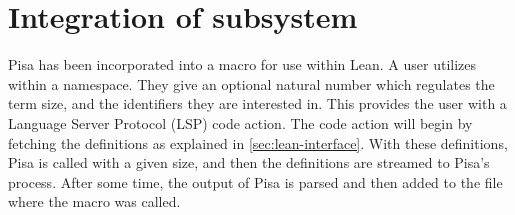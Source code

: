 \section{Integration of subsystem}\label{sec:integration-of-subsystem}
Pisa has been incorporated into a macro for use within Lean.
A user utilizes  within a namespace.
They give an optional natural number which regulates the term size, and the identifiers they are interested in.
This provides the user with a Language Server Protocol (LSP) code action.
The code action will begin by fetching the definitions as explained in \cref{sec:lean-interface}.
With these definitions, Pisa is called with a given size, and then the definitions are streamed to Pisa's process.
After some time, the output of Pisa is parsed and then added to the file where the macro was called.
